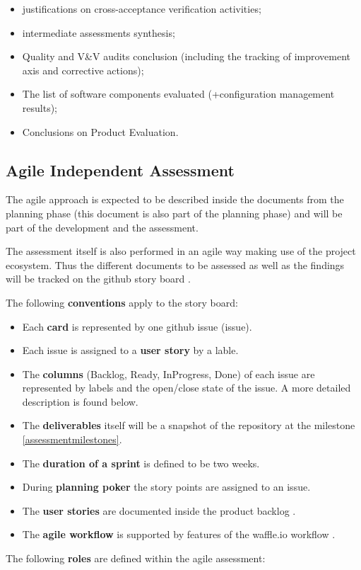 \documentclass[openetcs]{template/openetcs_article}
\begin{document}
\begin{itemize}
\item justifications on cross-acceptance verification activities;
\item intermediate assessments synthesis;
\item Quality and V\&V audits conclusion (including the tracking of improvement axis and corrective actions);
\item The list of software components evaluated (+configuration management results);
\item Conclusions on Product Evaluation.
\end{itemize}



\subsection{Agile Independent Assessment}
The agile approach is expected to be described inside the documents from the planning phase (this document is also part of the planning phase) and will be part of the development and the assessment.

The assessment itself is also performed in an agile way making use of the project ecosystem. Thus the different documents to be assessed as well as the findings will be tracked on the github story board \cite{ASB}. 

The following \textbf{conventions} apply to the story board:
\begin{itemize}
\item Each \textbf{card} is represented by one github issue (issue).
\item Each issue is assigned to a \textbf{user story} by a lable.
\item The \textbf{columns} (Backlog, Ready, InProgress, Done) of each issue are represented by labels and the open/close state of the issue. A more detailed description is found below.
\item The \textbf{deliverables} itself will be a snapshot of the repository at the milestone \ref{assessmentmilestones}.
\item The \textbf{duration of a sprint} is defined to be two weeks.
\item During \textbf{planning poker}  the story points are assigned to an issue.
\item The \textbf{user stories} are documented inside the product backlog \cite{productbacklog}.
\item The \textbf{agile workflow} is supported by features of the waffle.io workflow \cite{waffleworkflow}.
\end{itemize}
The following \textbf{roles} are defined within the agile assessment:
\end{document}

